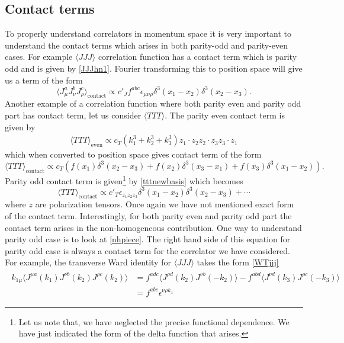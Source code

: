 \documentclass[a4paper,11pt]{article}
\begin{document}
\subsection{Contact terms}\label{contact}
To properly understand correlators in momentum space it is very important to understand the contact terms which arises in both 
parity-odd and parity-even cases. For example  $\langle JJJ\rangle$ correlation function has a contact term which is parity odd and is given by \eqref{JJJhn1}. Fourier transforming this to position space will give us a term of the form
\begin{equation}
    \langle J^{a}_{\mu}J^{b}_{\nu}J^{c}_{\rho}\rangle_{\text{contact}}\propto c'_{J} f^{abc} \epsilon_{\mu\nu\rho} \delta^3(x_1-x_2) \delta^3(x_2-x_3).
\end{equation}
Another example of a correlation function where both parity even and parity odd part has contact term, let us consider $\langle TTT\rangle$. The parity even contact term is given by \cite{Farrow:2018yni}
\begin{align}
    \langle TTT\rangle_{\text{even}} \propto c_{T}\left(k_1^3+k_2^3+k_3^3\right)z_1\cdot z_2 z_2\cdot z_3 z_3\cdot z_1
\end{align}
which when converted to position space gives contact term of the form
\begin{equation}
   \langle TTT\rangle_{\text{contact}} \propto c_{T} \left(f(x_1)\delta^3(x_2-x_3)+f(x_2)\delta^3(x_3-x_1)+f(x_3)\delta^3(x_1-x_2)\right).
\end{equation}
Parity odd contact term is given\footnote{Let us note that, we have neglected the precise functional dependence. We have just indicated the form of the delta function that arises.} by \eqref{tttnewbasis} which becomes
\begin{equation}
     \langle TTT\rangle_{\text{contact}} \propto c'_{T} \epsilon_{z_1 z_2 z_3}\delta^3(x_1-x_2) \delta^3(x_2-x_3)+ \cdots
\end{equation} where $z$ are polarization tensors. Once again we have not mentioned exact form of the contact term.
Interestingly, for both parity even and parity odd part the contact term arises in the non-homogeneous contribution.  One way to understand parity odd case is to  look at \eqref{nhpiece}. The right hand side of this equation for parity odd case is always a contact term for the correlator we have considered. For example, the transverse Ward identity for $\langle JJJ \rangle $ takes the form \eqref{WTjjj}
\begin{align}
\label{WTjjj1}
\begin{split}
k_{1\mu}\langle J^{\mu a}(k_1) J^{\nu b}(k_2) J^{\rho c}(k_2) \rangle &= f^{adc}\langle J^{\rho d}(k_2)J^{\nu b}(-k_2) \rangle-f^{abd}\langle J^{\nu d}(k_3)J^{\rho c}(-k_3) \rangle\nonumber \\[5 pt]
&= f^{abc}\epsilon^{\nu\rho k_1}
\end{split}
\end{align}
\end{document}

